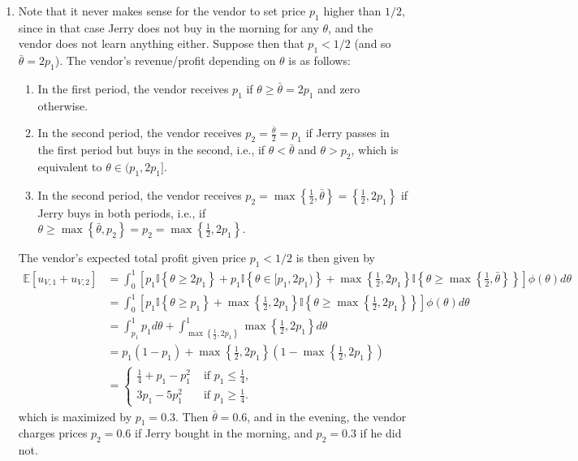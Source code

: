 \documentclass[a4paper]{article}
\begin{document}
\begin{enumerate}
	\item Note that it never makes sense for the vendor to set price $p_1$ higher than $1/2$, since in that case Jerry does not buy in the morning for any $\theta$, and the vendor does not learn anything either.
	Suppose then that $p_1 < 1/2$ (and so $\bar{\theta} = 2p_1$). The vendor's revenue/profit depending on $\theta$ is as follows:
	\begin{enumerate}
		\item In the first period, the vendor receives $p_1$ if $\theta \geq \bar{\theta} = 2p_1$ and zero otherwise.
		\item In the second period, the vendor receives $p_2 = \frac{\bar{\theta}}{2} = p_1$ if Jerry passes in the first period but buys in the second, i.e., if $\theta < \bar{\theta}$ and $\theta > p_2$, which is equivalent to $\theta \in (p_1, 2p_1]$.
		\item In the second period, the vendor receives $p_2 = \max \left\{ \frac{1}{2}, \bar{\theta} \right\} = \left\{ \frac{1}{2}, 2p_1 \right\}$ if Jerry buys in both periods, i.e., if $\theta \geq \max \left\{ \bar{\theta}, p_2 \right\} = p_2 = \max \left\{ \frac{1}{2}, 2p_1 \right\}$.
	\end{enumerate}
	
	The vendor's expected total profit given price $p_1 < 1/2$ is then given by
	\begin{align*}
		\mathbb{E} \left[ u_{V,1} + u_{V,2} \right] 
		&= \int_0^1 \left[ 
		p_1 \mathbb{I}\left\{ \theta \geq 2p_1 \right\} 
		+ p_1 \mathbb{I} \left\{ \theta \in [p_1, 2p_1) \right\} 
		+ \max \left\{ \frac{1}{2}, 2p_1 \right\} \mathbb{I} \left\{ \theta \geq \max \left\{ \frac{1}{2}, \bar{\theta} \right\} \right\} 
		\right] \phi(\theta) d\theta 
		\\&= \int_0^1 \left[ 
		p_1 \mathbb{I}\left\{ \theta \geq p_1 \right\} 
		+ \max \left\{ \frac{1}{2}, 2p_1 \right\} \mathbb{I} \left\{ \theta \geq \max \left\{ \frac{1}{2}, 2p_1 \right\} \right\} 
		\right] \phi(\theta) d\theta 
		\\
		&= \int_{p_1}^1 p_1 d\theta +
		\int_{\max \left\{ \frac{1}{2}, 2p_1 \right\}}^{1} \max \left\{ \frac{1}{2}, 2p_1 \right\} d\theta 
		\\
		&= p_1(1-p_1) + \max \left\{ \frac{1}{2}, 2p_1 \right\} \left( 1 - \max \left\{ \frac{1}{2}, 2p_1 \right\} \right)
		\\
		&= \begin{cases}
			\frac{1}{4} + p_1 - p_1^2 & \text{ if } p_1 \leq \frac{1}{4},
			\\
			3p_1 - 5p_1^2 & \text{ if } p_1 \geq \frac{1}{4}.
		\end{cases}
	\end{align*}
	which is maximized by $p_1 = 0.3$. Then $\bar{\theta} = 0.6$, and in the evening, the vendor charges prices $p_2 = 0.6$ if Jerry bought in the morning, and $p_2 = 0.3$ if he did not.
	

\end{enumerate}
\end{document}
